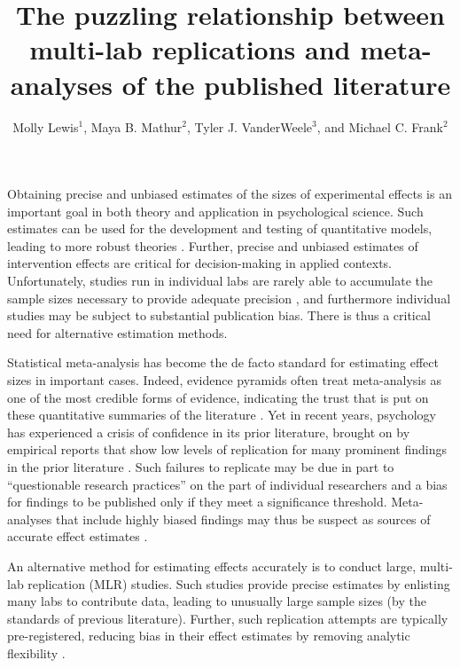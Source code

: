 \documentclass[man]{apa7}
\title{The puzzling relationship between multi-lab replications and 
meta-analyses of the published literature
}
\author{Molly Lewis$^{1}$, Maya B. Mathur$^{2}$, Tyler J. VanderWeele$^{3}$, and Michael C. Frank$^{2}$}
\affiliation{$^{1}$Carnegie Mellon University\\
$^{2}$Stanford University\\
$^{3}$Harvard University\\}
\begin{document}
\maketitle


Obtaining precise and unbiased estimates of the sizes of experimental effects is an important goal in both theory and application in psychological science. Such estimates can be used for the development and testing of quantitative models, leading to more robust theories \parencite{oberauer2019addressing}. Further, precise and unbiased estimates of intervention effects are critical for decision-making in applied contexts. Unfortunately, studies run in individual labs are rarely able to accumulate the sample sizes necessary to provide adequate precision \parencite{simonsohn_2014}, and furthermore individual studies may be subject to substantial publication bias.  There is thus a critical need for alternative estimation methods. 

Statistical meta-analysis \parencite{gurevitch2018meta,dersimonian1986meta} has become the de facto standard for estimating effect sizes in important cases. Indeed, evidence pyramids often treat meta-analysis as one of the most credible forms of evidence, indicating the trust that is put on these quantitative summaries of the literature \parencite{higgins2019cochrane}. Yet in recent years, psychology has experienced a crisis of confidence in its prior literature, brought on by empirical reports that show low levels of replication for many prominent findings in the prior literature \parencite{open2015estimating,klein2014investigating,klein2018many,ebersole2016many}. Such failures to replicate may be due in part to “questionable research practices” on the part of individual researchers \parencite[e.g., post-hoc analytic decision-making;][]{masicampo2012peculiar} and a bias for findings to be published only if they meet a significance threshold. Meta-analyses that include highly biased findings may thus be suspect as sources of accurate effect estimates  \parencite[or even as indicators of whether an effect is consistently non-zero;][]{vadillo2016selection}. 

An alternative method for estimating effects accurately is to conduct large, multi-lab replication (MLR) studies. Such studies provide precise estimates by enlisting many labs to contribute data, leading to unusually large sample sizes (by the standards of previous literature). Further, such replication attempts are typically pre-registered, reducing bias in their effect estimates by removing analytic flexibility \parencite{nosek2018preregistration}. 
\end{document}

